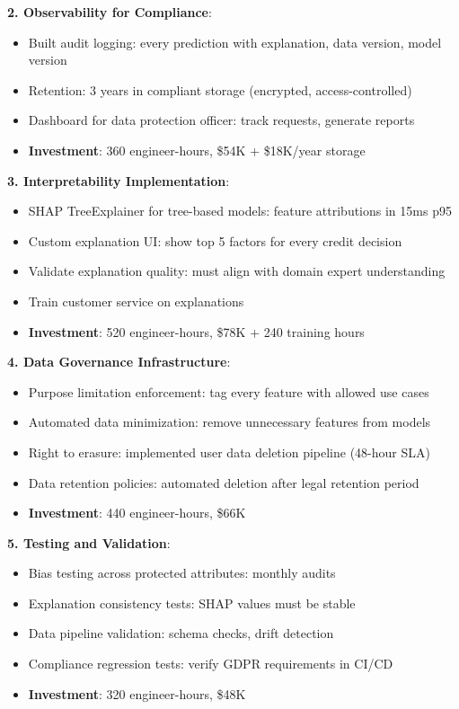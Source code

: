 \textbf{2. Observability for Compliance}:
\begin{itemize}
    \item Built audit logging: every prediction with explanation, data version, model version
    \item Retention: 3 years in compliant storage (encrypted, access-controlled)
    \item Dashboard for data protection officer: track requests, generate reports
    \item \textbf{Investment}: 360 engineer-hours, \$54K + \$18K/year storage
\end{itemize}

\textbf{3. Interpretability Implementation}:
\begin{itemize}
    \item SHAP TreeExplainer for tree-based models: feature attributions in 15ms p95
    \item Custom explanation UI: show top 5 factors for every credit decision
    \item Validate explanation quality: must align with domain expert understanding
    \item Train customer service on explanations
    \item \textbf{Investment}: 520 engineer-hours, \$78K + 240 training hours
\end{itemize}

\textbf{4. Data Governance Infrastructure}:
\begin{itemize}
    \item Purpose limitation enforcement: tag every feature with allowed use cases
    \item Automated data minimization: remove unnecessary features from models
    \item Right to erasure: implemented user data deletion pipeline (48-hour SLA)
    \item Data retention policies: automated deletion after legal retention period
    \item \textbf{Investment}: 440 engineer-hours, \$66K
\end{itemize}

\textbf{5. Testing and Validation}:
\begin{itemize}
    \item Bias testing across protected attributes: monthly audits
    \item Explanation consistency tests: SHAP values must be stable
    \item Data pipeline validation: schema checks, drift detection
    \item Compliance regression tests: verify GDPR requirements in CI/CD
    \item \textbf{Investment}: 320 engineer-hours, \$48K
\end{itemize}

